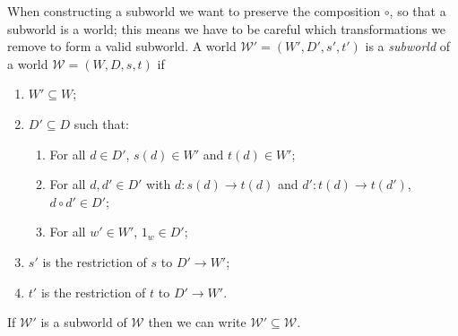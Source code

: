 When constructing a subworld we want to preserve the composition $\circ$, so that a subworld is a world; this means we have to be careful which transformations we remove to form a valid subworld.
A world $\mathscr{W}' = (W', D', s', t')$ is a \emph{subworld} of a world $\mathscr{W} = (W, D, s, t)$ if
\begin{enumerate}
    \item $W' \subseteq W$;
    \item $D' \subseteq D$ such that:
    \begin{enumerate}
        \item For all $d \in D'$, $s(d) \in W'$ and $t(d) \in W'$;
        \item For all $d, d' \in D'$ with $d: s(d) \to t(d)$ and $d': t(d) \to t(d')$, $d \circ d' \in D'$;
        \item For all $w' \in W'$, $1_{w} \in D'$;
    \end{enumerate}
    \item $s'$ is the restriction of $s$ to $D' \to W'$;
    \item $t'$ is the restriction of $t$ to $D' \to W'$.
\end{enumerate}

\begin{definition}
    If $\mathscr{W}'$ is a subworld of $\mathscr{W}$ then we can write $\mathscr{W}' \subseteq \mathscr{W}$.
\end{definition}

